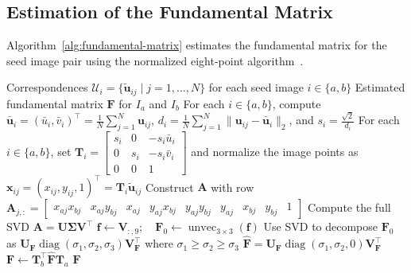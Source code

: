 \documentclass[11pt,a4paper]{article}
\begin{document}
\subsection{Estimation of the Fundamental Matrix}

Algorithm~\ref{alg:fundamental-matrix} estimates the fundamental matrix for the seed image pair using the normalized eight-point algorithm~\cite{hartley1997eightpoint}.

\begin{algorithm}[htbp]
  \caption{Estimation of the Fundamental Matrix}
  \label{alg:fundamental-matrix}
  \begin{algorithmic}[1]
    \Require Correspondences \(\mathcal{U}_i = \{\tilde{\mathbf u}_{ij} \mid j = 1, \dots, N\}\) for each seed image \(i \in \{a, b\}\)
    \Ensure Estimated fundamental matrix \(\mathbf F\) for \(I_a\) and \(I_b\)
    \State \label{line:fundamental-matrix-normalization-parameters} For each \(i \in \{a,b\}\), compute \(\bar{\mathbf u}_i = (\bar u_i,\bar v_i)^\top = \frac{1}{N}\sum_{j=1}^{N}\mathbf u_{ij}\), \(d_i = \frac{1}{N}\sum_{j=1}^{N}\|\mathbf u_{ij}-\bar{\mathbf u}_i\|_2\), and \(s_i = \frac{\sqrt{2}}{d_i}\)
    \State \label{line:fundamental-matrix-normalize-points} For each \(i \in \{a,b\}\), set \(\mathbf{T}_i = \begin{bmatrix}
s_i & 0 & -s_i\bar u_i\\
0 & s_i & -s_i\bar v_i\\
0 & 0 & 1
\end{bmatrix}\) and normalize the image points as \(\mathbf{x}_{ij} = (x_{ij},y_{ij},1)^\top = \mathbf{T}_i \tilde{\mathbf u}_{ij}\)
    \State Construct \(\mathbf{A}\) with row \(\mathbf{A}_{j,:} = \begin{bmatrix}
x_{aj}x_{bj} & x_{aj}y_{bj} & x_{aj} &
y_{aj}x_{bj} & y_{aj}y_{bj} & y_{aj} &
x_{bj} & y_{bj} & 1
\end{bmatrix}\)
    \State Compute the full SVD \(\mathbf{A} = \mathbf{U}\boldsymbol{\Sigma}\mathbf{V}^\top\)
    \State \(\mathbf f \gets \mathbf{V}_{:,9}; \quad \mathbf{F}_0\gets\operatorname{unvec}_{3\times3}(\mathbf f)\) 
    \State Use SVD to decompose \(\mathbf{F}_0\) as \(\mathbf{U}_{\mathbf{F}} \operatorname{diag}(\sigma_1,\sigma_2,\sigma_3) \mathbf{V}_{\mathbf{F}}^\top\) where \(\sigma_1\ge \sigma_2\ge \sigma_3\)
    \State \(\hat{\mathbf{F}} = \mathbf{U}_{\mathbf{F}} \operatorname{diag}(\sigma_1,\sigma_2,0) \mathbf{V}_{\mathbf{F}}^{\top}\) 
    \State \(\mathbf{F} \gets \mathbf{T}_b^\top \hat{\mathbf{F}} \mathbf{T}_a\)
    \State \Return \(\mathbf{F}\)
  \end{algorithmic}
\end{algorithm}
\end{document}
